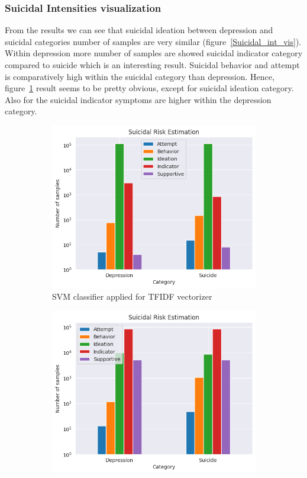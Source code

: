 \documentclass[sn-mathphys,Numbered]{sn-jnl}%
\theoremstyle{thmstyleone}%
\theoremstyle{thmstyletwo}%
\theoremstyle{thmstylethree}%
\begin{document}
\subsubsection{Suicidal Intensities visualization}
From the results we can see that suicidal ideation between depression and suicidal categories number of samples are very similar (figure~\ref{Suicidal_int_vis}). Within depression more number of samples are showed suicidal indicator category compared to suicide which is an interesting result. Suicidal behavior and attempt is comparatively high within the suicidal category than depression. Hence, figure~\ref{SVMTFIDF} result seems to be pretty obvious, except for suicidal ideation category. Also for the suicidal indicator symptoms are higher within the depression category. 
\begin{figure}[H]
\centering
\begin{subfigure}{0.45\textwidth}
    \includegraphics[width=\textwidth]{grid_svm.png}
    \caption{SVM classifier applied for TFIDF vectorizer}
    \label{SVMTFIDF}
\end{subfigure}
\hfill
\begin{subfigure}{0.45\textwidth}
    \includegraphics[width=\textwidth]{glove_vec.png}

\end{subfigure}
\end{figure}
\end{document}
